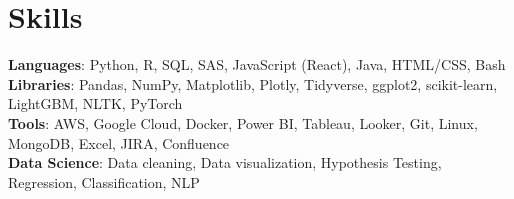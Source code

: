 \section{Skills}
 \begin{itemize}[leftmargin=0.15in, label={}]
    \small{\item{
     \textbf{Languages}{: Python, R, SQL, SAS, JavaScript (React), Java, HTML/CSS, Bash} \\
     \textbf{Libraries}{: Pandas, NumPy, Matplotlib, Plotly, Tidyverse, ggplot2, scikit-learn, LightGBM, NLTK, PyTorch}\\
     \textbf{Tools}{: AWS, Google Cloud, Docker, Power BI, Tableau, Looker, Git, Linux, MongoDB, Excel, JIRA, Confluence}\\
     \textbf{Data Science}{: Data cleaning, Data visualization, Hypothesis Testing, Regression, Classification, NLP}\\
    }}
 \end{itemize}